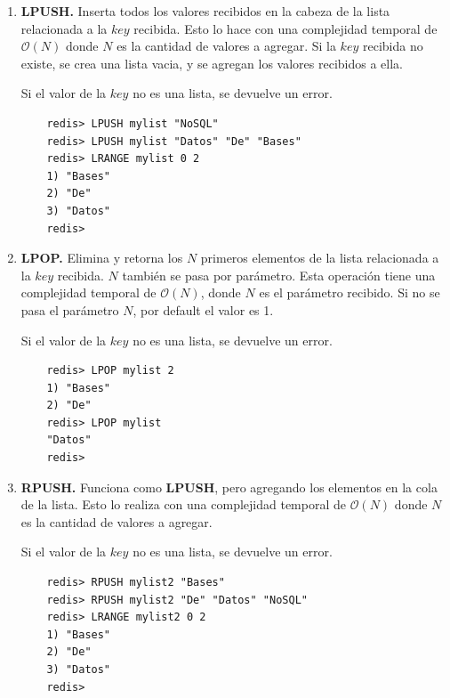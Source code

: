 \documentclass[pdflatex,sn-mathphys-num]{sn-jnl}
\theoremstyle{thmstyleone}%
\theoremstyle{thmstyletwo}%
\theoremstyle{thmstylethree}%
\begin{document}
\begin{enumerate}
    \item \textbf{LPUSH.} Inserta todos los valores recibidos en la cabeza de la lista relacionada a la $key$ recibida. Esto lo hace con una complejidad temporal de $\mathcal{O}(N)$ donde $N$ es la cantidad de valores a agregar. Si la $key$ recibida no existe, se crea una lista vacia, y se agregan los valores recibidos a ella. 
    
    Si el valor de la $key$ no es una lista, se devuelve un error.

    \begin{verbatim}
    redis> LPUSH mylist "NoSQL"
    redis> LPUSH mylist "Datos" "De" "Bases"
    redis> LRANGE mylist 0 2
    1) "Bases"
    2) "De"
    3) "Datos"
    redis>
    \end{verbatim}

    \vspace{-0.5cm}

    \item \textbf{LPOP.} Elimina y retorna los $N$ primeros elementos de la lista relacionada a la $key$ recibida. $N$ también se pasa por parámetro. Esta operación tiene una complejidad temporal de $\mathcal{O}(N)$, donde $N$ es el parámetro recibido. Si no se pasa el parámetro $N$, por default el valor es 1.

    Si el valor de la $key$ no es una lista, se devuelve un error.
    
    \begin{verbatim}
    redis> LPOP mylist 2
    1) "Bases"
    2) "De"
    redis> LPOP mylist
    "Datos"
    redis>
    \end{verbatim}

    \vspace{-0.5cm}
    
    \item \textbf{RPUSH.} Funciona como \textbf{LPUSH}, pero agregando los elementos en la cola de la lista. Esto lo realiza con una complejidad temporal de $\mathcal{O}(N)$ donde $N$ es la cantidad de valores a agregar.

    Si el valor de la $key$ no es una lista, se devuelve un error.

    \begin{verbatim}
    redis> RPUSH mylist2 "Bases"
    redis> RPUSH mylist2 "De" "Datos" "NoSQL"
    redis> LRANGE mylist2 0 2
    1) "Bases"
    2) "De"
    3) "Datos"
    redis>
    \end{verbatim}

    \vspace{-0.5cm}
    

\end{enumerate}
\end{document}
